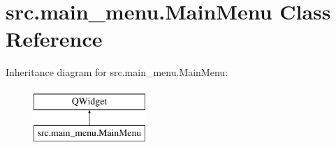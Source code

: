 \hypertarget{classsrc_1_1main__menu_1_1_main_menu}{}\section{src.\+main\+\_\+menu.\+Main\+Menu Class Reference}
\label{classsrc_1_1main__menu_1_1_main_menu}
Inheritance diagram for src.\+main\+\_\+menu.\+Main\+Menu\+:\begin{figure}[H]
\begin{center}
\leavevmode
\includegraphics[height=2.000000cm]{classsrc_1_1main__menu_1_1_main_menu}
\end{center}
\end{figure}
